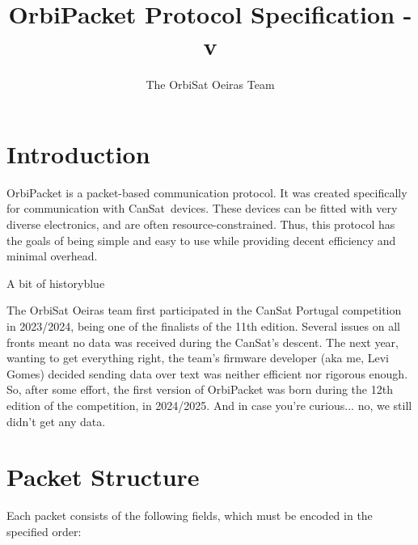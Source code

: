 \documentclass[a4paper,11pt,english]{article}
\title{OrbiPacket Protocol Specification - v\version}
\author{The OrbiSat Oeiras Team}
\date{}
\def\notebox#1#2{
  \begin{admobox}{#1}{blue}
  #2
  \end{admobox}
}
\begin{document}
\maketitle

\tableofcontents

\section[intro]{Introduction}

OrbiPacket is a packet-based communication protocol. It was created specifically for communication with CanSat\footnotemark\ devices. These devices can be fitted with very diverse electronics, and are often resource-constrained. Thus, this protocol has the goals of being simple and easy to use while providing decent efficiency and minimal overhead.


\notebox{A bit of history}{
  The OrbiSat Oeiras team first participated in the CanSat Portugal competition in 2023/2024, being one of the finalists of the 11th edition. Several issues on all fronts meant no data was received during the CanSat's descent. The next year, wanting to get everything right, the team's firmware developer (aka me, Levi Gomes) decided sending data over text was neither efficient nor rigorous enough. So, after some effort, the first version of OrbiPacket was born during the 12th edition of the competition, in 2024/2025. And in case you're curious... no, we still didn't get any data.
}

\section[fields]{Packet Structure}

Each packet consists of the following fields, which must be encoded in the specified order:
\end{document}

